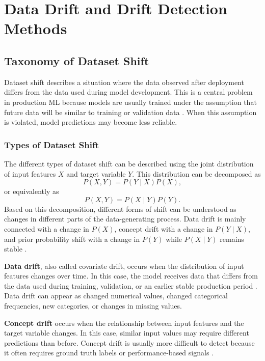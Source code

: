 \chapter{Data Drift and Drift Detection Methods}
\label{ch:data-drift-methods}

\section{Taxonomy of Dataset Shift}

Dataset shift describes a situation where the data observed after deployment differs from the data used during model development. This is a central problem in production ML because models are usually trained under the assumption that future data will be similar to training or validation data \cite{MonitoringPerformance}. When this assumption is violated, model predictions may become less reliable.

\subsection{Types of Dataset Shift}
The different types of dataset shift can be described using the joint distribution of input features $X$ and target variable $Y$. This distribution can be decomposed as
\begin{equation}
P(X,Y) = P(Y \mid X)P(X),
\end{equation}
or equivalently as
\begin{equation}
P(X,Y) = P(X \mid Y)P(Y).
\end{equation}
Based on this decomposition, different forms of shift can be understood as changes in different parts of the data-generating process. Data drift is mainly connected with a change in $P(X)$, concept drift with a change in $P(Y \mid X)$, and prior probability shift with a change in $P(Y)$ while $P(X \mid Y)$ remains stable \cite{MorenoTorresDatasetShift2012,GamaConceptDriftSurvey2014}.

\textbf{Data drift}, also called covariate drift, occurs when the distribution of input features changes over time. In this case, the model receives data that differs from the data used during training, validation, or an earlier stable production period \cite{MonitoringPerformance}. Data drift can appear as changed numerical values, changed categorical frequencies, new categories, or changes in missing values.

\textbf{Concept drift} occurs when the relationship between input features and the target variable changes. In this case, similar input values may require different predictions than before. Concept drift is usually more difficult to detect because it often requires ground truth labels or performance-based signals \cite{LearningUnderConceptDrift}.


